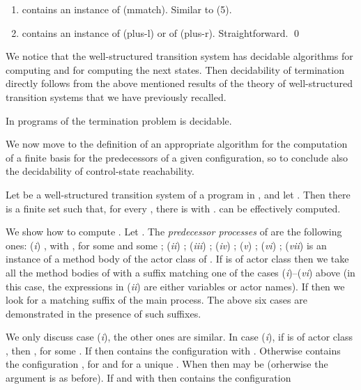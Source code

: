 \documentclass{LMCS}
\theoremstyle{plain}\newtheorem{proposition}[thm]{Proposition}
\theoremstyle{plain}\newtheorem{lemma}[thm]{Lemma}
\theoremstyle{plain}\newtheorem{theorem}[thm]{Theorem}
\theoremstyle{plain}\newtheorem{corollary}[thm]{Corollary}
\newif\ifconf \conffalse
\newif\ifcamera \camerafalse
\newcommand{\rulename}[1]{{\sc(#1)}}
\newcommand{\actroba}{}
\begin{document}
\begin{enumerate}
\item
 contains an instance of \rulename{mmatch}. Similar to (5).

\item
 contains an instance of \rulename{plus-l} or of 
\rulename{plus-r}. Straightforward.
\qed
\end{enumerate}
\fi


We notice that the well-structured transition system  
has decidable algorithms for computing  and for computing the next states. 
Then decidability of termination directly follows from the above mentioned
results of the theory of well-structured transition systems that we have
previously recalled.
\ifcamera
Then decidability of termination follows.
\else
\fi

\ifcamera
\else
\fi

\begin{thm}
\ifcamera
In {\actroba} termination is decidable.
\else
In programs of {\actroba}
the termination
problem is decidable.
\fi
\end{thm}

We now move to the definition of an appropriate algorithm for the
computation of a finite basis for the predecessors of a given configuration,
so to conclude also the decidability of control-state reachability.

\begin{lem}
\label{lem.pred}
Let  be a well-structured transition system 
of a program in {\actroba}, and let . Then there is a finite set  
such that, for every , there is 
with .  can be effectively computed.
\end{lem}

\ifconf
\else

\proof
We show how to compute . Let . The \emph{predecessor processes} of  are the following ones:
(\emph{i}) , with , for some 
 and some ;
(\emph{ii}) ;
(\emph{iii}) ;
(\emph{iv}) ;
(\emph{v}) ;
(\emph{vi}) ;
(\emph{vii})  is an instance of a method body of the actor class of .
If  is of actor class  then we take all the method bodies of
 with a suffix matching one of the cases (\emph{i})--(\emph{vi}) 
above (in this case, the expressions in (\emph{ii}) are either variables or
actor names). If  then we look for a matching suffix of the 
main process. The above six cases are demonstrated 
in the presence of such suffixes.

We only discuss case (\emph{i}), the other ones are similar.
In case (\emph{i}), if  is of actor class , then 
, for some . If  then   contains the configuration
 with 
. Otherwise  contains the configuration
, for  and for a unique .
When  then  may be  (orherwise the 
argument is as before). 
If  and  with 
then   contains the configuration
\end{document}
